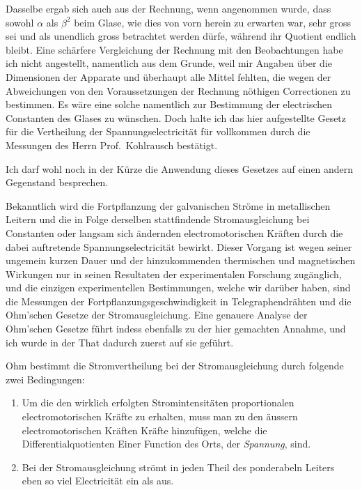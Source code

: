 \documentclass[12pt,a4paper]{article}
\begin{document}
Dasselbe ergab sich auch aus der Rechnung, wenn angenommen wurde, dass sowohl $\alpha$ als $\beta^2$ beim Glase, wie dies von vorn herein zu erwarten war, sehr gross sei und als unendlich gross betrachtet werden dürfe, während ihr Quotient endlich bleibt. Eine schärfere Vergleichung der Rechnung mit den Beobachtungen habe ich nicht angestellt, namentlich aus dem Grunde, weil mir Angaben über die Dimensionen der Apparate und überhaupt alle Mittel fehlten, die wegen der Abweichungen von den Voraussetzungen der Rechnung nöthigen Correctionen zu bestimmen. Es wäre eine solche namentlich zur Bestimmung der electrischen Constanten des Glases zu wünschen. Doch halte ich das hier aufgestellte Gesetz für die Vertheilung der Spannungselectricität für vollkommen durch die Messungen des Herrn Prof.~Kohlrausch bestätigt.

Ich darf wohl noch in der Kürze die Anwendung dieses Gesetzes auf einen andern Gegenstand besprechen.

Bekanntlich wird die Fortpflanzung der galvanischen Ströme in metallischen Leitern und die in Folge derselben stattfindende Stromausgleichung bei Constanten oder langsam sich ändernden electromotorischen Kräften durch die dabei auftretende Spannungselectricität bewirkt. Dieser Vorgang ist wegen seiner ungemein kurzen Dauer und der hinzukommenden thermischen und magnetischen Wirkungen nur in seinen Resultaten der experimentalen Forschung zugänglich, und die einzigen experimentellen Bestimmungen, welche wir darüber haben, sind die Messungen der Fortpflanzungsgeschwindigkeit in Telegraphendrähten und die Ohm'schen Gesetze der Stromausgleichung. Eine genauere Analyse der Ohm'schen Gesetze führt indess ebenfalls zu der hier gemachten Annahme, und ich wurde in der That dadurch zuerst auf sie geführt.

Ohm bestimmt die Stromvertheilung bei der Stromausgleichung durch folgende zwei Bedingungen:
\begin{enumerate}
\item Um die den wirklich erfolgten Stromintensitäten proportionalen electromotorischen Kräfte zu erhalten, muss man zu den äussern electromotorischen Kräften Kräfte hinzufügen, welche die Differentialquotienten Einer Function des Orts, der \textit{Spannung}, sind.
\item Bei der Stromausgleichung strömt in jeden Theil des ponderabeln Leiters eben so viel Electricität ein als aus.
\end{enumerate}
\end{document}
